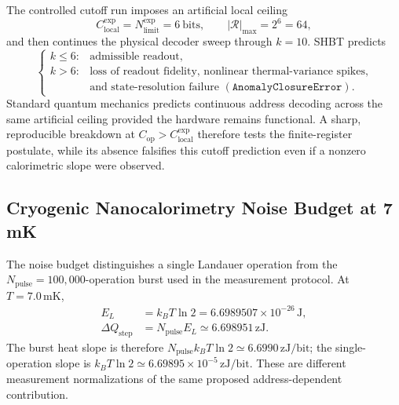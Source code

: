 \documentclass[11pt,letterpaper]{article}
\theoremstyle{plain}
\begin{document}
The controlled cutoff run imposes an artificial local ceiling
\begin{equation}
\label{eq:calorimetry-artificial-capacity-ceiling}
 C_{\text{local}}^{\text{exp}}
 =
 N_{\text{limit}}^{\text{exp}}
 =
 6\ \text{bits},
 \qquad
 |\mathcal R|_{\text{max}}=2^6=64,
\end{equation}
and then continues the physical decoder sweep through \(k=10\).  SHBT predicts
\begin{equation}
\label{eq:calorimetry-capacity-signature}
 \begin{cases}
  k\le6: & \text{admissible readout},\\
  k>6: & \text{loss of readout fidelity, nonlinear thermal-variance spikes,}
          \\[-0.2em]
        & \text{and state-resolution failure }(\texttt{AnomalyClosureError}).
 \end{cases}
\end{equation}
Standard quantum mechanics predicts continuous address decoding across the
same artificial ceiling provided the hardware remains functional.  A sharp,
reproducible breakdown at \(C_{\text{op}}>C_{\text{local}}^{\text{exp}}\) therefore
tests the finite-register postulate, while its absence falsifies this cutoff
prediction even if a nonzero calorimetric slope were observed.

\subsection{Cryogenic Nanocalorimetry Noise Budget at 7 mK}
\label{sec:cryo_noise_budget}

The noise budget distinguishes a single Landauer operation from the
\(N_{\text{pulse}}=100{,}000\)-operation burst used in the measurement
protocol.  At \(T=7.0\,\mathrm{mK}\),
\begin{align}
\label{eq:noise-budget-single-event}
 E_L&=k_BT\ln2
 =6.6989507\times10^{-26}\,\mathrm{J},\\
\label{eq:noise-budget-burst-step}
 \Delta Q_{\text{step}}&=N_{\text{pulse}}E_L
 \simeq6.698951\,\mathrm{zJ}.
\end{align}
The burst heat slope is therefore
\(N_{\text{pulse}}k_BT\ln2\simeq6.6990\,\mathrm{zJ/bit}\);
the single-operation slope is
\(k_BT\ln2\simeq6.69895\times10^{-5}\,\mathrm{zJ/bit}\).
These are different measurement normalizations of the same proposed
address-dependent contribution.
\end{document}
